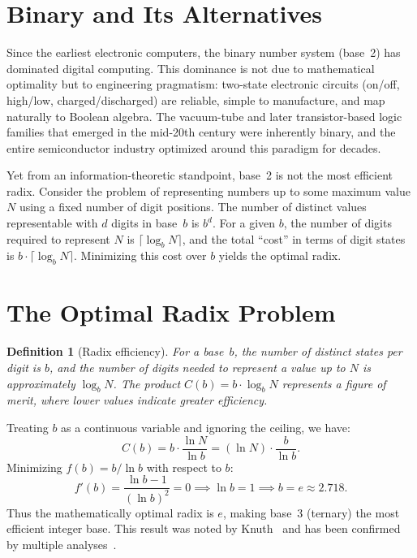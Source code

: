 \documentclass[10pt,a4paper,twoside]{book}
\newtheorem{definition}{Definition}[chapter]
\begin{document}
\section{Binary and Its Alternatives}

Since the earliest electronic computers, the binary number system (base~2) has dominated
digital computing. This dominance is not due to mathematical optimality but to engineering
pragmatism: two-state electronic circuits (on/off, high/low, charged/discharged) are
reliable, simple to manufacture, and map naturally to Boolean algebra. The vacuum-tube
and later transistor-based logic families that emerged in the mid-20th century were
inherently binary, and the entire semiconductor industry optimized around this
paradigm for decades.

Yet from an information-theoretic standpoint, base~2 is not the most efficient radix.
Consider the problem of representing numbers up to some maximum value $N$ using a fixed
number of digit positions. The number of distinct values representable with $d$ digits in
base~$b$ is $b^d$. For a given $b$, the number of digits required to represent $N$ is
$\lceil\log_b N\rceil$, and the total ``cost'' in terms of digit states is $b \cdot
\lceil\log_b N\rceil$. Minimizing this cost over $b$ yields the optimal radix.

\section{The Optimal Radix Problem}

\begin{definition}[Radix efficiency]
For a base~$b$, the number of distinct states per digit is $b$, and the number of digits
needed to represent a value up to $N$ is approximately $\log_b N$. The product
$C(b) = b \cdot \log_b N$ represents a figure of merit, where lower values indicate
greater efficiency.
\end{definition}

Treating $b$ as a continuous variable and ignoring the ceiling, we have:
\[
C(b) = b \cdot \frac{\ln N}{\ln b} = (\ln N) \cdot \frac{b}{\ln b}.
\]
Minimizing $f(b) = b / \ln b$ with respect to $b$:
\[
f'(b) = \frac{\ln b - 1}{(\ln b)^2} = 0 \implies \ln b = 1 \implies b = e \approx 2.718.
\]
Thus the mathematically optimal radix is $e$, making base~3 (ternary) the most efficient
integer base. This result was noted by Knuth~\cite{knuth1997art} and has been confirmed
by multiple analyses~\cite{hurts1989comparison}.
\end{document}

